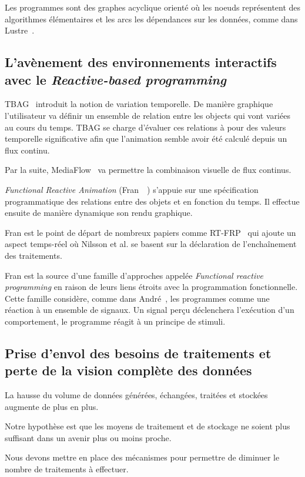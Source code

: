 \documentclass{llncs}
\newcommand{\RP}{\emph{Reactive-based programming} }
\newcommand{\FRP}{\emph{Functional reactive programming} }
\begin{document}
Les programmes sont des graphes acyclique orienté où les noeuds représentent des
algorithmes élémentaires et les arcs les dépendances sur les données, comme dans
Lustre~\cite{Caspi87}.

\subsection{L'avènement des environnements interactifs avec le \RP}
TBAG~\cite{Elliott94} introduit la notion de variation temporelle.
De manière graphique l'utilisateur va définir un ensemble de relation
entre les objects qui vont variées au cours du temps.
TBAG se charge d'évaluer ces relations à pour des valeurs temporelle
significative afin que l'animation semble avoir été calculé depuis
un flux continu.

Par la suite, MediaFlow~\cite{Elliott95} va permettre la combinaison visuelle
de flux continus.

\emph{Functional Reactive Animation} (Fran~\cite{Elliott97}~\cite{Elliott98})
s'appuie sur une spécification programmatique des relations entre des objets
et en fonction du temps.
Il effectue ensuite de manière dynamique son rendu graphique.

Fran est le point de départ de nombreux papiers comme RT-FRP~\cite{Wan02}
qui ajoute un aspect temps-réel où Nilsson et al.\cite{Nilsson2002a} se basent
sur la déclaration de l'enchaînement des traitements.

Fran est la source d'une famille d'approches appelée \FRP en raison de leurs liens
étroits avec la programmation fonctionnelle.
Cette famille considère, comme dans André~\cite{Andre96}, les programmes comme
une réaction à un ensemble de signaux. Un signal perçu déclenchera l'exécution
d'un comportement, le programme réagit à un principe de stimuli.

\subsection{Prise d'envol des besoins de traitements et perte de la vision complète des données}
La hausse du volume de données générées, échangées, traitées et stockées augmente de
plus en plus.

Notre hypothèse est que les moyens de traitement et de stockage ne soient plus
suffisant dans un avenir plus ou moins proche.

Nous devons mettre en place des mécanismes pour permettre de diminuer le nombre
de traitements à effectuer.
\end{document}
